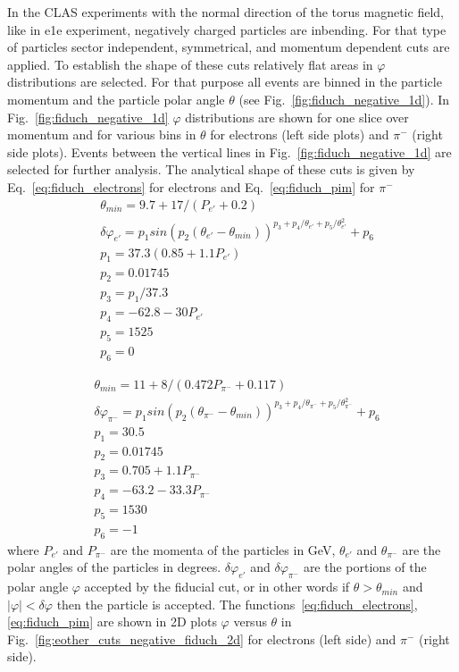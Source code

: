 In the CLAS experiments with the normal direction of the torus magnetic field, like in e1e experiment, negatively charged particles are inbending. For that type of particles sector independent, symmetrical, and momentum dependent cuts are applied. To establish the shape of these cuts relatively flat areas in $\varphi$ distributions are selected. For that purpose all events are binned in  the particle momentum and the particle polar angle $\theta$ (see Fig.~\ref{fig:fiduch_negative_1d}). In Fig.~\ref{fig:fiduch_negative_1d} $\varphi$ distributions are shown for one slice over momentum and for various bins in $\theta$ for electrons (left side plots) and $\pi^{-}$ (right side plots). Events between the vertical lines in Fig.~\ref{fig:fiduch_negative_1d} are selected for further analysis. The analytical shape of these cuts is given by Eq.~\ref{eq:fiduch_electrons} for electrons and Eq.~\ref{eq:fiduch_pim} for $\pi^{-}$
\begin{equation}
\begin{aligned}
& \theta_{min}  = 9.7 + 17/(P_{e'} + 0.2) \\
& \delta\varphi_{e'}  = p_{1}sin(p_{2}(\theta_{e'}-\theta_{min}))^{p_{3}+p_{4}/\theta_{e'}+p_{5}/\theta_{e'}^{2}} + p_{6}  \\
& p_{1}  = 37.3(0.85 + 1.1P_{e'}) \\
& p_{2}  = 0.01745 \\
& p_{3}  = p_{1}/37.3 \\
& p_{4}  = -62.8 - 30P_{e'} \\
& p_{5}  = 1525 \\
& p_{6}  = 0  \label{eq:fiduch_electrons}
\end{aligned}  
\end{equation}

\begin{equation}
\begin{aligned}
& \theta_{min} = 11 + 8/(0.472P_{\pi^{-}} + 0.117) \\
& \delta\varphi_{\pi^{-}} = p_{1}sin(p_{2}(\theta_{\pi^{-}}-\theta_{min}))^{p_{3}+p_{4}/\theta_{\pi^{-}}+p_{5}/\theta_{\pi^{-}}^{2}} + p_{6} \\
& p_{1} = 30.5 \\
& p_{2} = 0.01745 \\
& p_{3} = 0.705 + 1.1P_{\pi^{-}} \\
& p_{4} = -63.2 - 33.3P_{\pi^{-}} \\
& p_{5} = 1530 \\
& p_{6} = -1 \label{eq:fiduch_pim}
\end{aligned}  
\end{equation}
where $P_{e'}$ and $P_{\pi^{-}}$ are the momenta of the particles in GeV, $\theta_{e'}$ and $\theta_{\pi^{-}}$ are the polar angles of the particles in degrees. $\delta\varphi_{e'}$ and $\delta\varphi_{\pi^{-}}$ are the portions of the polar angle
$\varphi$ accepted by the fiducial cut, or in other words if
$\theta > \theta_{min}$ and $|\varphi| < \delta\varphi$ then the particle is accepted. 
The functions~\ref{eq:fiduch_electrons},\ref{eq:fiduch_pim} are shown in 2D plots $\varphi$ versus $\theta$ in Fig.~\ref{fig:eother_cuts_negative_fiduch_2d} for electrons (left side) and $\pi^{-}$ (right side).

